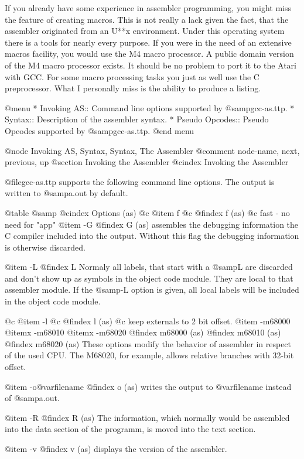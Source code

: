 {{{{If you already have some experience in assembler programming, you might
miss the feature of creating macros. This is not really a lack given the
fact, that the assembler originated from an U**x environment. Under
this operating system there is a tools for nearly every purpose. If you
were in the need of an extensive macros facility, you would use the M4
macro processor. A public domain version of the M4 macro processor
exists. It should be no problem to port it to the Atari with GCC. For
some macro processing tasks you just as well use the C preprocessor.
What I personally miss is the ability to produce a listing.

@menu
* Invoking AS::     Command line options supported by @samp{gcc-as.ttp}.
* Syntax::          Description of the assembler syntax.
* Pseudo Opcodes::  Pseudo Opcodes supported by @samp{gcc-as.ttp}.
@end menu

@node     Invoking AS, Syntax, Syntax, The Assembler    
@comment  node-name,   next,   previous, up
@section Invoking the Assembler
@cindex Invoking the Assembler

@file{gcc-as.ttp} supports the following command line options. The output
is written to @samp{a.out} by default.

@table @samp
@cindex Options (as)
@c @item f
@c @findex f (as)
@c fast - no need for "app"
@item -G
@findex G (as)
assembles the debugging information the C compiler included into the
output. Without this flag the debugging information is otherwise
discarded.

@item -L
@findex L
Normaly all labels, that start with a @samp{L} are discarded and don't
show up as symbols in the object code module. They are local to that
assembler module. If the @samp{-L} option is given, all local labels
will be included in the object code module.

@c @item -l
@c @findex l (as)
@c keep externals to 2 bit offset.
@item -m68000
@itemx -m68010
@itemx -m68020
@findex m68000 (as)
@findex m68010 (as)
@findex m68020 (as)
These options modify the behavior of assembler in respect of the used
CPU. The M68020, for example, allows relative branches with 32-bit
offset.

@item -o@var{filename}
@findex o (as)
writes the output to @var{filename} instead of @samp{a.out}.

@item -R
@findex R (as)
The information, which normally would be assembled into the data section
of the programm, is moved into the text section.

@item -v
@findex v (as)
displays the version of the assembler.

}}}}
